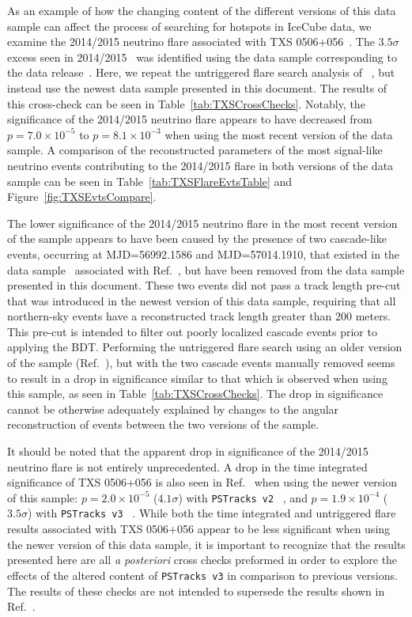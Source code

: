 \documentclass[aps,10pt,prd,twocolumn,floats,letterpaper,showpacs,nofootinbib,bibnotes,notitlepage,superscriptaddress,floatfix]{revtex4-1}
\newcommand{\MA}[1]{{\color{magenta}#1}}
\begin{document}
As an example of how the changing content of the different versions of this data sample can affect the process of searching for hotspots in IceCube data, we examine the 2014/2015 neutrino flare associated with TXS 0506+056~\cite{IceCube:2018cha}. The $3.5 \sigma$ excess seen in 2014/2015~\cite{IceCube:2018cha} was identified using the data sample corresponding to the data release~\cite{IceCube:2019}. Here, we repeat the untriggered flare search analysis of ~\cite{IceCube:2018cha}, but instead use the newest data sample presented in this document. The results of this cross-check can be seen in Table~\ref{tab:TXSCrossChecks}. Notably, the significance of the 2014/2015 neutrino flare appears to have decreased from $p=7.0 \times 10^{-5}$ to $p=8.1 \times 10^{-3}$ when using the most recent version of the data sample. A comparison of the reconstructed parameters of the most signal-like neutrino events contributing to the 2014/2015 flare in both versions of the data sample can be seen in Table~\ref{tab:TXSFlareEvtsTable} and Figure~\ref{fig:TXSEvtsCompare}.

The lower significance of the 2014/2015 neutrino flare in the most recent version of the sample appears to have been caused by the presence of two cascade-like events, occurring at MJD=56992.1586 and MJD=57014.1910, that existed in the data sample~\cite{IceCube:2019} associated with Ref.~\cite{IceCube:2018cha}, but have been removed from the data sample presented in this document. These two events did not pass a track length pre-cut that was introduced in the newest version of this data sample, requiring that all northern-sky events have a reconstructed track length greater than 200 meters. This pre-cut is intended to filter out poorly localized cascade events prior to applying the BDT. Performing the untriggered flare search using an older version of the sample (Ref.~\cite{IceCube:2019}), but with the two cascade events manually removed seems to result in a drop in significance similar to that which is observed when using this sample, as seen in Table~\ref{tab:TXSCrossChecks}. The drop in significance cannot be otherwise adequately explained by changes to the angular reconstruction of events between the two versions of the sample. 

 It should be noted that the apparent drop in significance of the 2014/2015 neutrino flare is not entirely unprecedented. A drop in the time integrated significance of TXS 0506+056 is also seen in Ref.~\cite{Aartsen:2019fau} when using the newer version of this sample: $p=2.0 \times 10^{-5}$ ($4.1\sigma$) with \MA{\tt PSTracks v2} ~\cite{IceCube:2018cha}, and $p=1.9 \times 10^{-4}$ ($3.5\sigma$) with \MA{\tt PSTracks v3} ~\cite{Aartsen:2019fau}. While both the time integrated and untriggered flare results associated with TXS 0506+056 appear to be less significant when using the newer version of this data sample, it is important to recognize that the results presented here are all \textit{a posteriori} cross checks preformed in order to explore the effects of the altered content of \MA{\tt PSTracks v3} in comparison to previous versions. The results of these checks are not intended to supersede the results shown in Ref.~\cite{IceCube:2018cha}.
\end{document}
